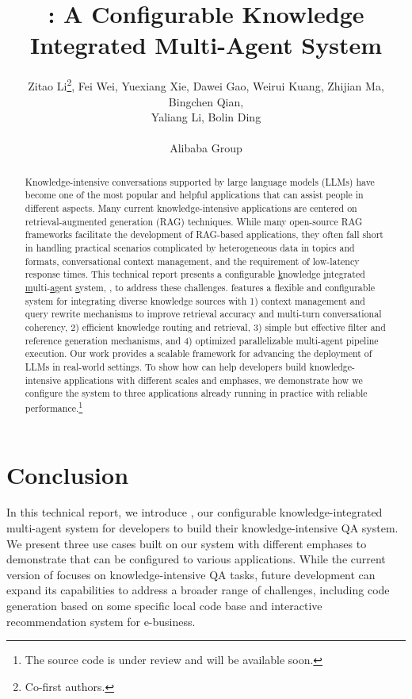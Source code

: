 \documentclass[english]{article}
\title{\ours: A Configurable Knowledge Integrated  Multi-Agent  System}
\date{}
\author{
Zitao Li\thanks{Co-first authors.}, Fei Wei\footnotemark[1], Yuexiang Xie\footnotemark[1], Dawei Gao, Weirui Kuang, Zhijian Ma, Bingchen Qian, 
\\Yaliang Li, Bolin Ding
\\
\\
\small{Alibaba Group}
}
\begin{document}
\maketitle
\begin{abstract}
Knowledge-intensive conversations supported by large language models (LLMs) have become one of the most popular and helpful applications that can assist people in different aspects.
Many current knowledge-intensive applications are centered on retrieval-augmented generation (RAG) techniques.
While many open-source RAG frameworks facilitate the development of RAG-based applications, they often fall short in handling practical scenarios complicated by heterogeneous data in topics and formats,  conversational context management, and the requirement of low-latency response times. 
This technical report presents a configurable \underline{k}nowledge \underline{i}ntegrated \underline{m}ulti-\underline{a}gent \underline{s}ystem, \ours, to address these challenges.   
\ours features a flexible and configurable system for integrating diverse knowledge sources with 1) context management and query rewrite mechanisms to improve retrieval accuracy and multi-turn conversational coherency, 2) efficient knowledge routing and retrieval, 3) simple but effective filter and reference generation mechanisms, and 4) optimized parallelizable multi-agent pipeline execution.
Our work provides a scalable framework for advancing the deployment of LLMs in real-world settings.
To show how \ours can help developers build knowledge-intensive applications with different scales and emphases, we demonstrate how we configure the system to three applications already running in practice with reliable performance.\footnote{The source code is under review and will be available soon.}
\end{abstract}






\section{Conclusion}
In this technical report, we introduce \ours, our configurable knowledge-integrated multi-agent system for developers to build their knowledge-intensive QA system.
We present three use cases built on our system with different emphases to demonstrate that \ours can be configured to various applications.
While the current version of \ours focuses on knowledge-intensive QA tasks, future development can expand its capabilities to address a broader range of challenges, including code generation based on some specific local code base and interactive recommendation system for e-business.



\end{document}
